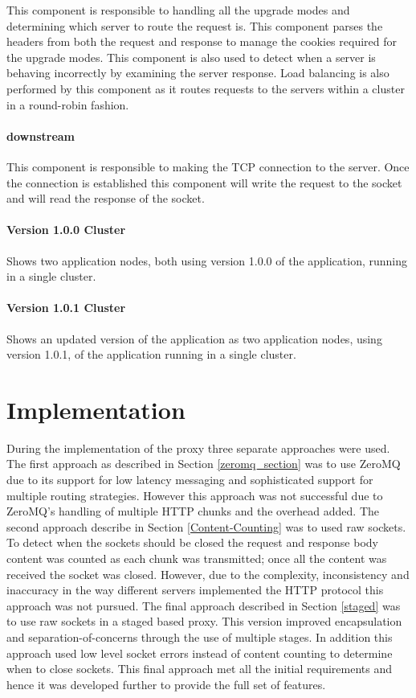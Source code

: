 \documentclass[a4paper,11pt,twoside]{report}
\begin{document}
\noindent
This component is responsible to handling all the upgrade modes and determining which server to route the request is.  This component parses the headers from both the request and response to manage the cookies required for the upgrade modes.  This component is also used to detect when a server is behaving incorrectly by examining the server response.  Load balancing is also performed by this component as it routes requests to the servers within a cluster in a round-robin fashion.

\subsubsection*{downstream}

\noindent
This component is responsible to making the TCP connection to the server.  Once the connection is established this component will write the request to the socket and will read the response of the socket.

\subsubsection*{Version 1.0.0 Cluster}

\noindent
Shows two application nodes, both using version 1.0.0 of the application, running in a single cluster.

\subsubsection*{Version 1.0.1 Cluster}

\noindent
Shows an updated version of the application as two application nodes, using version 1.0.1, of the application running in a single cluster.

\clearpage

\chapter{Implementation} \label{Implementation}
During the implementation of the proxy three separate approaches were used.  The first approach as described in Section \ref{zeromq_section} was to use ZeroMQ due to its support for low latency messaging and sophisticated support for multiple routing strategies.  However this approach was not successful due to ZeroMQ's handling of multiple HTTP chunks and the overhead added.  The second approach describe in Section \ref{Content-Counting} was to used raw sockets.  To detect when the sockets should be closed the request and response body content was counted as each chunk was transmitted; once all the content was received the socket was closed.  However, due to the complexity, inconsistency and inaccuracy in the way different servers implemented the HTTP protocol this approach was not pursued.  The final approach described in Section \ref{staged} was to use raw sockets in a staged based proxy.  This version improved encapsulation and separation-of-concerns through the use of multiple stages.  In addition this approach used low level socket errors instead of content counting to determine when to close sockets.  This final approach met all the initial requirements and hence it was developed further to provide the full set of features.
\end{document}
